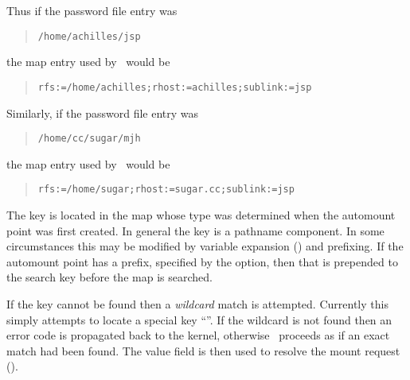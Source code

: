 Thus if the password file entry was
\begin{quote}
\tt /home/achilles/jsp
\end{quote}
the map
entry used by \amd\ would be
\begin{quote}
\tt rfs:=/home/achilles;rhost:=achilles;sublink:=jsp
\end{quote}
Similarly, if the password file entry was
\begin{quote}
\tt /home/cc/sugar/mjh
\end{quote}
the map entry used by \amd\ would be 
\begin{quote}
\tt rfs:=/home/sugar;rhost:=sugar.cc;sublink:=jsp
\end{quote}



The key is located in the map whose type was determined when the
automount point was first created.
In general the key is a pathname component.
In some circumstances this may be modified by variable expansion
(\see {})
and prefixing.
If the automount point has a prefix, specified by the  option, then
that is prepended to the search key before the map is searched.

If the key cannot be found then a {\em wildcard} match is attempted.
Currently this simply attempts to locate a special key ``{\tt *}''.
If the wildcard is not found then an error code is propagated back to the
kernel, otherwise \amd\ proceeds as if an exact match had been found.
The value field is then used to resolve the mount request (\see {}).


\label{opts:values}

